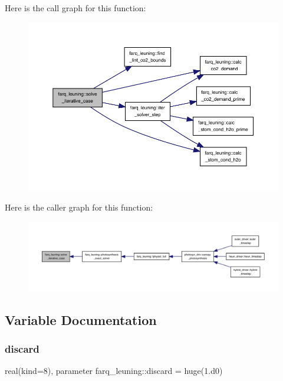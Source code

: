 Here is the call graph for this function\+:
\nopagebreak
\begin{figure}[H]
\begin{center}
\leavevmode
\includegraphics[width=350pt]{namespacefarq__leuning_a88f53f468e321e185e87a1fa9f890116_cgraph}
\end{center}
\end{figure}
Here is the caller graph for this function\+:
\nopagebreak
\begin{figure}[H]
\begin{center}
\leavevmode
\includegraphics[width=350pt]{namespacefarq__leuning_a88f53f468e321e185e87a1fa9f890116_icgraph}
\end{center}
\end{figure}


\subsection{Variable Documentation}
\mbox{\label{namespacefarq__leuning_a31a2c362c8646a0912470a61a19135b2}} 
\subsubsection{\texorpdfstring{discard}{discard}}
{\footnotesize\ttfamily real(kind=8), parameter farq\+\_\+leuning\+::discard = huge(1.d0)}

